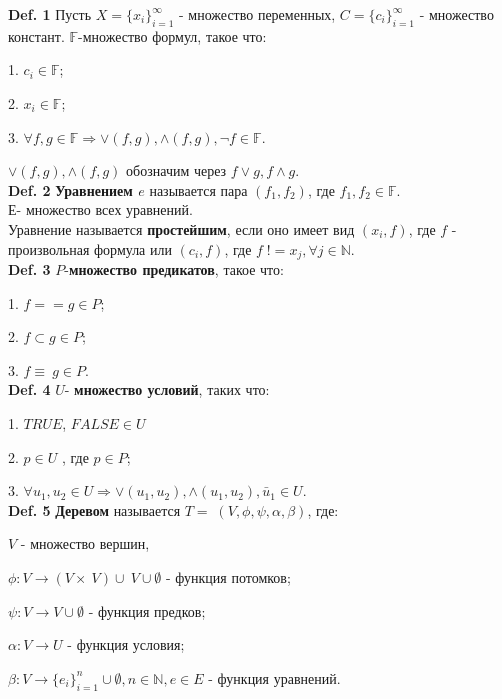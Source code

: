 \documentclass[12pt]{article}
\begin{document}
 
	{\bf Def. 1} Пусть $X = \lbrace  x_{i}  \rbrace_{i=1}^{\infty} $ - множество переменных,
	$C = \lbrace  c_{i}  \rbrace_{i=1}^{\infty} $ - множество констант. $\mathbb{F}$-множество формул, такое что:
	
	1. $c_{i} \in \mathbb{F} $; 
	
	2. $x_{i} \in \mathbb{F} $; 
	
	3. $\forall f, g \in \mathbb{F} \Rightarrow \vee(f,g), \wedge(f,g), \neg f \in \mathbb{F}$.
	
	 $\vee(f,g), \wedge(f,g)$ обозначим через $f \vee g, f \wedge g$.
	\\

	{\bf Def. 2} {\bf Уравнением  $e$} называется пара $(f_{1},f_{2})$, где $f_{1},f_{2} \in \mathbb{F}$.\\Е- множество всех уравнений.
	\\Уравнение называется {\bf простейшим}, если оно имеет вид $(x_{i}, f)$, где $f$ - произвольная формула или $(c_{i}, f)$, где $f \; != x_{j}, \forall j \in \mathbb{N}$.
	\\
	
	{\bf Def. 3} $P$-{\bf множество предикатов}, такое что: 
	
	1. $f==g \in P$; 
	
    2. $f \subset g \in P$;
    
    3. $f \equiv \: g \in P$.
    \\
    
    {\bf Def. 4}  $U$- {\bf множество условий}, таких что: 
    
    1. $TRUE$, $FALSE \in U$
    
    2. $p \in U$ , где $p \in P$;
    
    3. $\forall u_{1}, u_{2} \in U \Rightarrow \vee(u_{1},u_{2}), \wedge(u_{1},u_{2}), \bar u_{1} \in U$.
    \\
    
     \hypertarget{d5}{{\bf Def. 5}} {\bf Деревом} называется $T = \; (V,\phi,\psi, \alpha, \beta)$, где: 
     
     $V$ - множество вершин,
     
      $\phi : V \rightarrow (V\times \:V)\cup \:V \cup \emptyset$ - функция потомков;
      
      $\psi : V \rightarrow V \cup \emptyset$ - функция предков;
      
      $\alpha : V \rightarrow U$ - функция условия;
      
      $\beta : V \rightarrow \lbrace  e_{i}  \rbrace_{i=1}^{n} \cup \emptyset, n \in \mathbb{N}, e \in E $ - функция уравнений.
     \\
     
\end{document}

